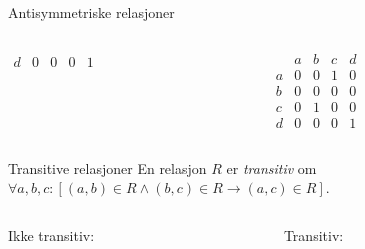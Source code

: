 \begin{frame}[fragile]{Antisymmetriske relasjoner}
\begin{columns}
\begin{column}{0.3\textwidth}
\begin{math}
\begin{matrix}
                    d & 0 & 0 & 0 & 1
                \end{matrix}
            \end{math}
        \end{column}
        \begin{column}{0.3\textwidth}
            \begin{math}
                \begin{matrix}
                      & a & b & c & d\\
                    a & 0 & 0 & 1 & 0\\
                    b & 0 & 0 & 0 & 0\\
                    c & 0 & 1 & 0 & 0\\
                    d & 0 & 0 & 0 & 1
                \end{matrix}
            \end{math}
        \end{column}
    \end{columns}
\end{frame}

\begin{frame}[fragile]{Transitive relasjoner}
    En relasjon $R$ er \emph{transitiv} om $\forall a, b, c : [(a, b) \in R \land (b, c) \in R \rightarrow (a, c) \in R]$.\\
    \begin{columns}
        \begin{column}{0.3\textwidth}
            Ikke transitiv:
        \end{column}
        \pause
        \begin{column}{0.3\textwidth}
            Transitiv:
        \end{column}
    \end{columns}
\end{frame}

